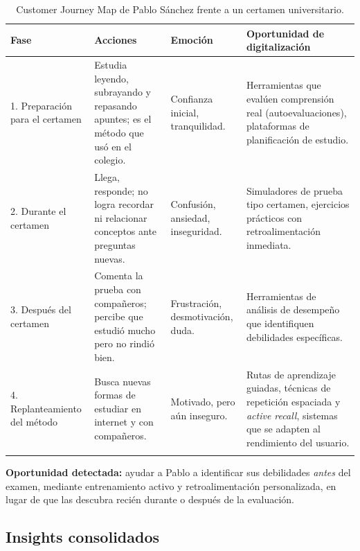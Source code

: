 \documentclass[11pt,a4paper]{article}
\begin{document}
\begin{longtable}{@{}p{2.3cm} p{3.2cm} p{3.1cm} p{5.1cm}@{}}
\toprule
\textbf{Fase} & \textbf{Acciones} & \textbf{Emoci\'on} & \textbf{Oportunidad de digitalizaci\'on} \\
\midrule
\endhead
1. Preparaci\'on para el certamen & Estudia leyendo, subrayando y repasando apuntes; es el m\'etodo que us\'o en el colegio. & Confianza inicial, tranquilidad. & Herramientas que eval\'uen comprensi\'on real (autoevaluaciones), plataformas de planificaci\'on de estudio. \\
2. Durante el certamen & Llega, responde; no logra recordar ni relacionar conceptos ante preguntas nuevas. & Confusi\'on, ansiedad, inseguridad. & Simuladores de prueba tipo certamen, ejercicios pr\'acticos con retroalimentaci\'on inmediata. \\
3. Despu\'es del certamen & Comenta la prueba con compa\~neros; percibe que estudi\'o mucho pero no rindi\'o bien. & Frustraci\'on, desmotivaci\'on, duda. & Herramientas de an\'alisis de desempe\~no que identifiquen debilidades espec\'ificas. \\
4. Replanteamiento del m\'etodo & Busca nuevas formas de estudiar en internet y con compa\~neros. & Motivado, pero a\'un inseguro. & Rutas de aprendizaje guiadas, t\'ecnicas de repetici\'on espaciada y \emph{active recall}, sistemas que se adapten al rendimiento del usuario. \\
\bottomrule
\caption{Customer Journey Map de Pablo S\'anchez frente a un certamen universitario.}
\end{longtable}

\textbf{Oportunidad detectada:} ayudar a Pablo a identificar sus debilidades \emph{antes} del examen, mediante entrenamiento activo y retroalimentaci\'on personalizada, en lugar de que las descubra reci\'en durante o despu\'es de la evaluaci\'on.

\subsection{Insights consolidados}
\end{document}
